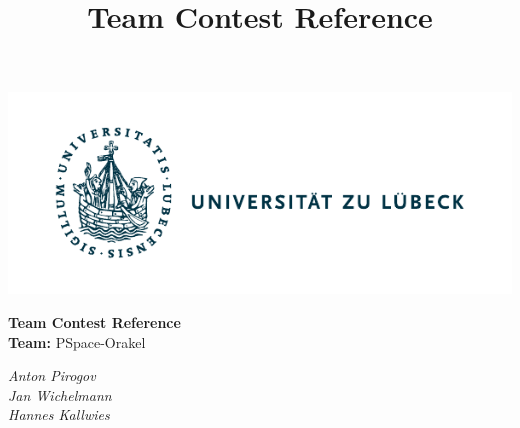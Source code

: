 \documentclass[10pt,a4paper,ngerman,oneside,]{article}
\title{Team Contest Reference}
\author{\university}
\newcommand\teamname{PSpace-Orakel}
\newcommand\teammembers{Anton Pirogov\\ Jan Wichelmann\\ Hannes Kallwies}
\begin{document}
\vspace{-5mm}
\begin{center}
	\begin{minipage}{0.3\textwidth}
	  \includegraphics[scale=.8,clip,trim=.4cm 0cm 6.4cm 0cm,scale=0.89]{img/logo_uzl.pdf}
    \end{minipage}
	\begin{minipage}{0.35\textwidth}
      \begin{center}
	    \LARGE{\bfseries Team Contest Reference}\\
        \textbf{Team:} {\teamname}
      \end{center}
    \end{minipage}
	\begin{minipage}{0.3\textwidth}
      \flushright
      \itshape\teammembers
    \end{minipage}
\end{center}
\thispagestyle{fancy}
\tableofcontents
\end{document}
